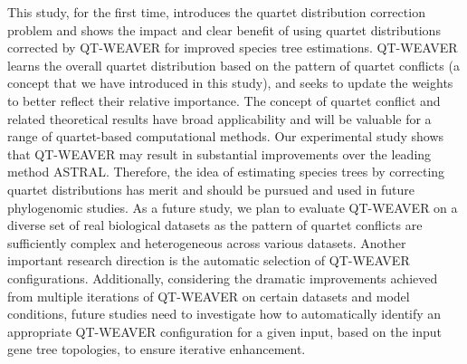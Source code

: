 \documentclass[10pt,a4paper]{article}
\begin{document}
This study, for the first time, introduces the quartet distribution correction problem and shows the impact and  clear benefit of using quartet distributions corrected by QT-WEAVER for improved species tree estimations. %
QT-WEAVER learns the overall quartet distribution based on the pattern of quartet conflicts (a concept that we have introduced in this study), and seeks to update the weights to better reflect their relative importance. The concept of quartet conflict and related theoretical results have broad applicability and will be valuable for a range of quartet-based computational methods. Our experimental study shows that QT-WEAVER may result in substantial improvements over the leading method ASTRAL.
Therefore, the idea of estimating species trees by correcting  quartet distributions has merit and should be pursued and used in future phylogenomic studies. %
As a future study, we plan to evaluate QT-WEAVER on a diverse set of real biological datasets as the pattern of quartet conflicts are sufficiently complex and heterogeneous across various datasets. Another important research direction is the automatic selection of QT-WEAVER configurations. %
Additionally, considering the dramatic improvements achieved from multiple iterations of QT-WEAVER on certain datasets and model conditions, future studies need to investigate how to automatically identify an appropriate QT-WEAVER configuration for a given input, based on the input gene tree topologies, to ensure iterative enhancement.
\end{document}
